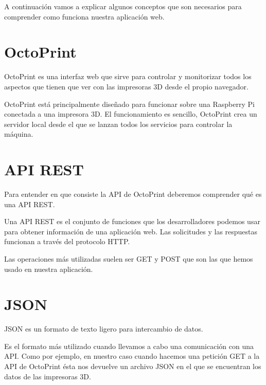 
A continuación vamos a explicar algunos conceptos que son necesarios para comprender como funciona nuestra aplicación web.

\section{OctoPrint}

OctoPrint \cite{octoprint} es una interfaz web que sirve para controlar y monitorizar todos los aspectos que tienen que ver con las impresoras 3D desde el propio navegador.

OctoPrint está principalmente diseñado para funcionar sobre una Raspberry Pi conectada a una impresora 3D. El funcionamiento es sencillo, OctoPrint crea un servidor local desde el que se lanzan todos los servicios para controlar la máquina.


\section{API REST}

Para entender en que consiste la API \cite{api} de OctoPrint deberemos comprender qué es una API REST.

Una API REST es el conjunto de funciones que los desarrolladores podemos usar para obtener información de una aplicación web. Las solicitudes y las respuestas funcionan a través del protocolo HTTP. 

Las operaciones más utilizadas suelen ser GET y POST que son las que hemos usado en nuestra aplicación.

\section{JSON}

JSON \cite{wiki:json} es un formato de texto ligero para intercambio de datos.

Es el formato más utilizado cuando llevamos a cabo una comunicación con una API. Como por ejemplo, en nuestro caso cuando hacemos una petición GET a la API de OctoPrint ésta nos devuelve un archivo JSON en el que se encuentran los datos de las impresoras 3D.


